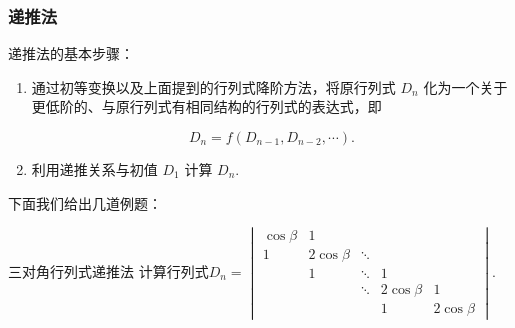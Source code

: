 \subsubsection{递推法}

递推法的基本步骤：

\begin{enumerate}
    \item 通过初等变换以及上面提到的行列式降阶方法，将原行列式 $D_n$ 化为一个关于更低阶的、与原行列式有相同结构的行列式的表达式，即

        \[
            D_n = f(D_{n-1}, D_{n-2}, \cdots).
        \]

    \item 利用递推关系与初值 $D_1$ 计算 $D_n$.
\end{enumerate}

下面我们给出几道例题：

\begin{example}{三对角行列式}{递推法}
    计算行列式$D_n=\begin{vmatrix}
            \cos \beta & 1            &        &              &              \\
            1          & 2 \cos \beta & \ddots &              &              \\
                       & 1            & \ddots & 1            &              \\
                       &              & \ddots & 2 \cos \beta & 1            \\
                       &              &        & 1            & 2 \cos \beta
        \end{vmatrix}$.
\end{example}

